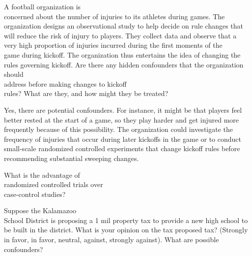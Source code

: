 \documentclass[11pt, chapterprefix=true]{scrbook}\usepackage[]{graphicx}\usepackage[]{color}
\begin{document}
\begin{exercises}
  \begin{exercise} %

A football organization is \\ concerned about the number of injuries to its athletes during games. The organization designs an observational study to help decide on rule changes that will reduce the risk of injury to players. They collect data and observe that a very high proportion of injuries incurred during the first moments of the \\ game during kickoff. The organization thus entertains the idea of changing the rules governing kickoff. Are there any hidden confounders that the organization should \\ address before making changes to  kickoff \\ rules? What are they, and how might they be treated?

	\end{exercise}
	\begin{solution}  %

Yes, there are potential confounders. For instance, it might be that players feel better rested at the start of a game, so they play harder and get injured more frequently because of this possibility. The organization could investigate the frequency of injuries that occur during later kickoffs in the game or to conduct small-scale randomized controlled experiments that change kickoff rules before recommending substantial sweeping changes.

	\end{solution}

	  \begin{exercise} %

What is the advantage of \\ randomized controlled trials over \\ case-control studies?

  \end{exercise}

	  \begin{exercise} %

Suppose the Kalamazoo \\ School District is proposing a 1 mil property tax to provide a new high school to be built in the district.  What is your opinion on the tax proposed tax?  (Strongly in favor, in favor, neutral, against, strongly against).  What are possible confounders?

  \end{exercise}
  
  

\end{exercises}
\end{document}
